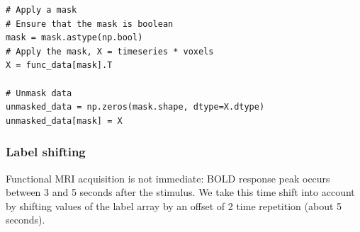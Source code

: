 \documentclass{frontiersSCNS} %
\newcommand{\alex}[1]{\todo[inline, color=green!40]{#1}}
\begin{document}
\begin{lstlisting}
# Apply a mask
# Ensure that the mask is boolean
mask = mask.astype(np.bool)
# Apply the mask, X = timeseries * voxels
X = func_data[mask].T

# Unmask data
unmasked_data = np.zeros(mask.shape, dtype=X.dtype)
unmasked_data[mask] = X
\end{lstlisting}







\subsubsection{Label shifting}

Functional MRI acquisition is not immediate: BOLD response peak occurs between 3
and 5 seconds after the stimulus. We take this time shift into account by
shifting values of the label array by an offset of 2 time repetition (about 5
seconds).


\end{document}
